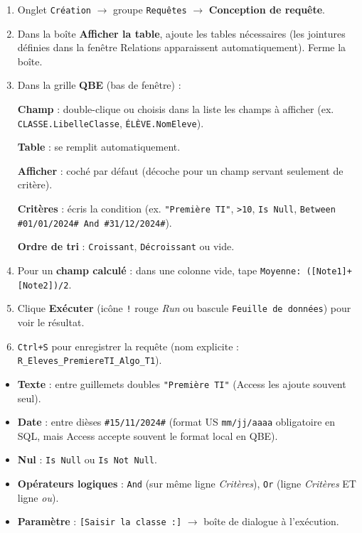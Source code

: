 \documentclass[11pt]{article}
\begin{document}
\begin{methode}
\begin{enumerate}
    \item Onglet \texttt{Création} $\to$ groupe \texttt{Requêtes} $\to$ \textbf{Conception de requête}.
    \item Dans la boîte \textbf{Afficher la table}, ajoute les tables nécessaires (les jointures définies dans la fenêtre Relations apparaissent automatiquement). Ferme la boîte.
    \item Dans la grille \textbf{QBE} (bas de fenêtre) :\par
    \textbf{Champ} : double-clique ou choisis dans la liste les champs à afficher (ex. \texttt{CLASSE.LibelleClasse}, \texttt{ÉLÈVE.NomEleve}).\par
    \textbf{Table} : se remplit automatiquement.\par
    \textbf{Afficher} : coché par défaut (décoche pour un champ servant seulement de critère).\par
    \textbf{Critères} : écris la condition (ex. \texttt{"Première TI"}, \texttt{>10}, \texttt{Is Null}, \texttt{Between \#01/01/2024\# And \#31/12/2024\#}).\par
    \textbf{Ordre de tri} : \texttt{Croissant}, \texttt{Décroissant} ou vide.
    \item Pour un \textbf{champ calculé} : dans une colonne vide, tape \texttt{Moyenne: ([Note1]+[Note2])/2}.
    \item Clique \textbf{Exécuter} (icône \texttt{!} rouge \emph{Run} ou bascule \texttt{Feuille de données}) pour voir le résultat.
    \item \texttt{Ctrl+S} pour enregistrer la requête (nom explicite : \texttt{R\_Eleves\_PremiereTI\_Algo\_T1}).
\end{enumerate}
\end{methode}

\begin{attention}
\begin{itemize}
    \item \textbf{Texte} : entre guillemets doubles \texttt{"Première TI"} (Access les ajoute souvent seul).
    \item \textbf{Date} : entre dièses \texttt{\#15/11/2024\#} (format US \texttt{mm/jj/aaaa} obligatoire en SQL, mais Access accepte souvent le format local en QBE).
    \item \textbf{Nul} : \texttt{Is Null} ou \texttt{Is Not Null}.
    \item \textbf{Opérateurs logiques} : \texttt{And} (sur même ligne \emph{Critères}), \texttt{Or} (ligne \emph{Critères} ET ligne \emph{ou}).
    \item \textbf{Paramètre} : \texttt{[Saisir la classe :]} $\to$ boîte de dialogue à l'exécution.
\end{itemize}
\end{attention}
\end{document}
